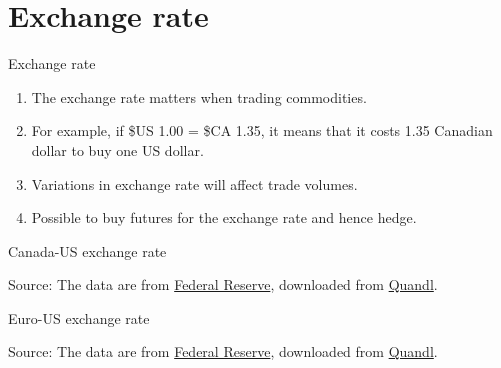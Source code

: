 \documentclass[table,xcolor=pdftex,dvipsnames]{beamer}\usepackage[]{graphicx}\usepackage[]{color}
\makeatletter
\newenvironment{kframe}{%
 \def\at@end@of@kframe{}%
 \ifinner\ifhmode%
  \def\at@end@of@kframe{\end{minipage}}%
  \begin{minipage}{\columnwidth}%
 \fi\fi%
 \def\FrameCommand##1{\hskip\@totalleftmargin \hskip-\fboxsep
 \colorbox{shadecolor}{##1}\hskip-\fboxsep
     \hskip-\linewidth \hskip-\@totalleftmargin \hskip\columnwidth}%
 \MakeFramed {\advance\hsize-\width
   \@totalleftmargin\z@ \linewidth\hsize
   \@setminipage}}%
 {\par\unskip\endMakeFramed%
 \at@end@of@kframe}
\newenvironment{knitrout}{}{} %
\makeatother
\begin{document}
\section{Exchange rate}

\begin{frame}{Exchange rate}
\begin{enumerate}[label=\textbullet]
    \item The exchange rate matters when trading commodities.
    \item For example, if \$US 1.00 = \$CA 1.35, it means that it costs 1.35 Canadian dollar to buy one US dollar.
    \item Variations in exchange rate will affect trade volumes.
    \item Possible to buy futures for the exchange rate and hence hedge.
\end{enumerate}
\end{frame}
%
\begin{frame}{Canada-US exchange rate}
\begin{knitrout}
\color{fgcolor}\begin{kframe}


{\ttfamily\noindent\bfseries\color{errorcolor}{\#\# Error in print(CAexchangerate): object 'CAexchangerate' not found}}\end{kframe}
\end{knitrout}
\scriptsize
Source: The data are from \href{http://www.federalreserve.gov/econresdata/default.htm}{Federal Reserve}, downloaded from \href{http://www.quandl.com/}{Quandl}.
\end{frame}

\begin{frame}{Euro-US exchange rate}
\begin{knitrout}
\color{fgcolor}\begin{kframe}


{\ttfamily\noindent\bfseries\color{errorcolor}{\#\# Error in print(EUexchangerate): object 'EUexchangerate' not found}}\end{kframe}
\end{knitrout}
\scriptsize
Source: The data are from \href{http://www.federalreserve.gov/econresdata/default.htm}{Federal Reserve}, downloaded from \href{http://www.quandl.com/}{Quandl}.
\end{frame}
\end{document}
